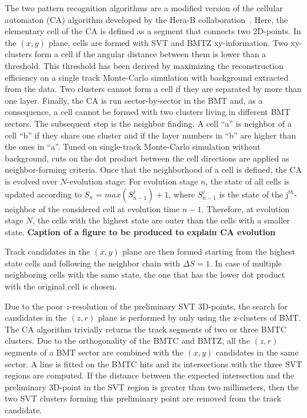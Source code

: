 The two pattern recognition algorithms are a modified version of the cellular automaton (CA) algorithm developed by the
Hera-B collaboration~\cite{CA-HeraB}. Here, the elementary cell of the CA is defined as a segment that connects two
2D-points.
In the $(x,y)$ plane, cells are formed with SVT and BMTZ xy-information. Two xy-clusters form a cell if the angular
distance between them is lower than a threshold. This threshold has been derived by maximizing the reconstruction
efficiency on a single track Monte-Carlo simulation with background extracted from the data. Two clusters cannot form a
cell if they are separated by more than one layer. Finally, the CA is run sector-by-sector in the BMT and, as a
consequence, a cell cannot be formed with two clusters living in different BMT sectors.
The subsequent step is the neighbor finding. A cell ``a'' is neighbor of a cell ``b'' if they share one cluster and if
the layer numbers in ``b'' are higher than the ones in ``a''. Tuned on single-track Monte-Carlo simulation without
background, cuts on the dot product between the cell directions are applied  as neighbor-forming criteria.
Once that the neighborhood of a cell is defined, the CA is evolved over $N$-evolution stage: For evolution stage $n$,
the state of all cells is updated according to $S_n = max(S_{n-1}^j) + 1$, where $S_{n-1}^j$ is the state of the
j$^{th}$-neighbor of the considered cell at evolution time $n-1$. Therefore, at evolution stage $N$, the cells with the
highest state are outer than the cells with a smaller state.
\color{red} \textbf{Caption of a figure to be produced to explain CA evolution} \color{black}

Track candidates in the $(x,y)$ plane are then formed starting from the highest state cells and following the neighbor
chain with $\Delta S = 1$. In case of multiple neighboring cells with the same state, the one that has the lower dot
product with the original cell is chosen.

Due to the poor $z$-resolution of the preliminary SVT 3D-points, the search for candidates in the $(z,r)$ plane is
performed by only using
the z-clusters of BMT. The CA algorithm trivially returns the track segments of two or three BMTC clusters.
Due to the orthogonality of the BMTC and BMTZ, all the $(z,r)$ segments of a BMT sector are combined with the $(x,y)$
candidates in the same sector. A line is fitted on the BMTC hits and its intersections with the three SVT regions are
computed. If the distance between the expected intersection and the preliminary 3D-point in the SVT region is greater
than two millimeters, then the two SVT clusters forming this preliminary point are removed from the track candidate.

